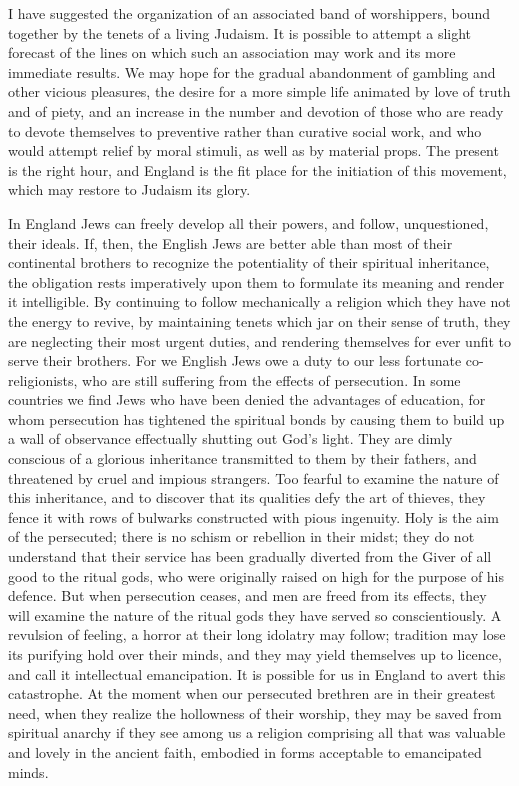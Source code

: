 I have suggested the organization of an associated band 
of worshippers, bound together by the tenets of a living 
Judaism. It is possible to attempt a slight forecast of the 
lines on which such an association may work and its more 
immediate results. We may hope for the gradual abandonment of gambling and other vicious pleasures, the desire for 
a more simple life animated by love of truth and of piety, 
and an increase in the number and devotion of those who 
are ready to devote themselves to preventive rather than 
curative social work, and who would attempt relief by 
moral stimuli, as well as by material props. The present 
is the right hour, and England is the fit place for the 
initiation of this movement, which may restore to Judaism 
its glory. 

In England Jews can freely develop all their powers, 
and follow, unquestioned, their ideals. If, then, the 
English Jews are better able than most of their continental 
brothers to recognize the potentiality of their spiritual 
inheritance, the obligation rests imperatively upon them to 
formulate its meaning and render it intelligible. By continuing to follow mechanically a religion which they have 
not the energy to revive, by maintaining tenets which 
jar on their sense of truth, they are neglecting their most 
urgent duties, and rendering themselves for ever unfit to 
serve their brothers. For we English Jews owe a duty 
to our less fortunate co-religionists, who are still suffering 
from the effects of persecution. In some countries we find 
Jews who have been denied the advantages of education, 
for whom persecution has tightened the spiritual bonds by 
causing them to build up a wall of observance effectually 
shutting out God's light. They are dimly conscious of a 
glorious inheritance transmitted to them by their fathers, 
and threatened by cruel and impious strangers. Too 
fearful to examine the nature of this inheritance, and to 
discover that its qualities defy the art of thieves, they 
fence it with rows of bulwarks constructed with pious 
ingenuity. Holy is the aim of the persecuted; there 
is no schism or rebellion in their midst; they do not understand that their service has been gradually diverted from 
the Giver of all good to the ritual gods, who were originally 
raised on high for the purpose of his defence. But when 
persecution ceases, and men are freed from its effects, they 
will examine the nature of the ritual gods they have served 
so conscientiously. A revulsion of feeling, a horror at 
their long idolatry may follow; tradition may lose its 
purifying hold over their minds, and they may yield themselves up to licence, and call it intellectual emancipation. 
It is possible for us in England to avert this catastrophe. 
At the moment when our persecuted brethren are in their 
greatest need, when they realize the hollowness of their 
worship, they may be saved from spiritual anarchy if they 
see among us a religion comprising all that was valuable 
and lovely in the ancient faith, embodied in forms acceptable to emancipated minds. 

